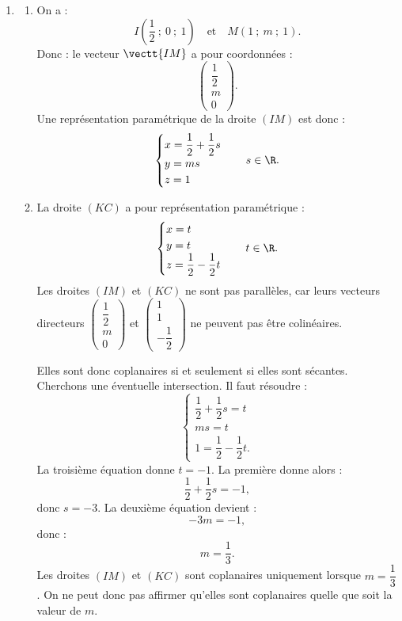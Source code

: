 \begin{enumerate}
	\item \begin{enumerate}
		\item On a :
		\[
		I\left(\dfrac12~;~0~;~1\right)
		\quad\text{et}\quad
		M(1~;~m~;~1).
		\]
		Donc :
		le vecteur $\vectt{IM}$ a pour coordonnées :
		\[
		\begin{pmatrix}\dfrac12\\m\\0\end{pmatrix}.
		\]
		Une représentation paramétrique de la droite $(IM)$ est donc :
		\[
		\begin{cases}
		x=\dfrac12+\dfrac12s\\
		y=ms\\
		z=1
		\end{cases}
		\quad s\in\R.
		\]

		\item La droite $(KC)$ a pour représentation paramétrique :
		\[
		\begin{cases}
		x=t\\
		y=t\\
		z=\dfrac12-\dfrac12t
		\end{cases}
		\quad t\in\R.
		\]
		Les droites $(IM)$ et $(KC)$ ne sont pas parallèles, car leurs vecteurs directeurs
		$\begin{pmatrix}\dfrac12\\m\\0\end{pmatrix}$ et $\begin{pmatrix}1\\1\\-\dfrac12\end{pmatrix}$ ne peuvent pas être colinéaires.

		Elles sont donc coplanaires si et seulement si elles sont sécantes.
		Cherchons une éventuelle intersection. Il faut résoudre :
		\[
		\begin{cases}
		\dfrac12+\dfrac12s=t\\
		ms=t\\
		1=\dfrac12-\dfrac12t.
		\end{cases}
		\]
		La troisième équation donne $t=-1$.
		La première donne alors :
		\[
		\dfrac12+\dfrac12s=-1,
		\]
		donc $s=-3$.
		La deuxième équation devient :
		\[
		-3m=-1,
		\]
		donc :
		\[
		m=\dfrac13.
		\]
		Les droites $(IM)$ et $(KC)$ sont coplanaires uniquement lorsque $m=\dfrac13$.
		On ne peut donc pas affirmer qu'elles sont coplanaires quelle que soit la valeur de $m$.
	\end{enumerate}
\end{enumerate}
